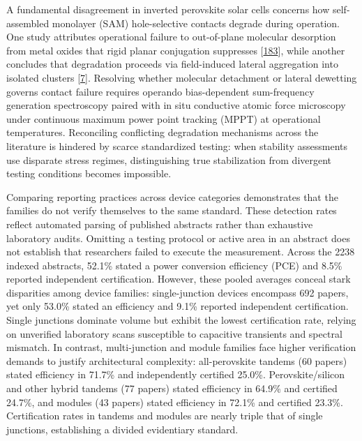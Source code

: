 \documentclass[
  11pt,
]{article}
\begin{document}
A fundamental disagreement in inverted perovskite solar cells concerns
how self-assembled monolayer (SAM) hole-selective contacts degrade
during operation. One study attributes operational failure to
out-of-plane molecular desorption from metal oxides that rigid planar
conjugation suppresses
{[}\href{https://doi.org/10.1016/j.scib.2026.02.050}{183}{]}, while
another concludes that degradation proceeds via field-induced lateral
aggregation into isolated clusters
{[}\href{https://doi.org/10.1038/s41467-026-72097-1}{7}{]}. Resolving
whether molecular detachment or lateral dewetting governs contact
failure requires operando bias-dependent sum-frequency generation
spectroscopy paired with in situ conductive atomic force microscopy
under continuous maximum power point tracking (MPPT) at operational
temperatures. Reconciling conflicting degradation mechanisms across the
literature is hindered by scarce standardized testing: when stability
assessments use disparate stress regimes, distinguishing true
stabilization from divergent testing conditions becomes impossible.

Comparing reporting practices across device categories demonstrates that
the families do not verify themselves to the same standard. These
detection rates reflect automated parsing of published abstracts rather
than exhaustive laboratory audits. Omitting a testing protocol or active
area in an abstract does not establish that researchers failed to
execute the measurement. Across the 2238 indexed abstracts, 52.1\%
stated a power conversion efficiency (PCE) and 8.5\% reported
independent certification. However, these pooled averages conceal stark
disparities among device families: single-junction devices encompass 692
papers, yet only 53.0\% stated an efficiency and 9.1\% reported
independent certification. Single junctions dominate volume but exhibit
the lowest certification rate, relying on unverified laboratory scans
susceptible to capacitive transients and spectral mismatch. In contrast,
multi-junction and module families face higher verification demands to
justify architectural complexity: all-perovskite tandems (60 papers)
stated efficiency in 71.7\% and independently certified 25.0\%.
Perovskite/silicon and other hybrid tandems (77 papers) stated
efficiency in 64.9\% and certified 24.7\%, and modules (43 papers)
stated efficiency in 72.1\% and certified 23.3\%. Certification rates in
tandems and modules are nearly triple that of single junctions,
establishing a divided evidentiary standard.
\end{document}
